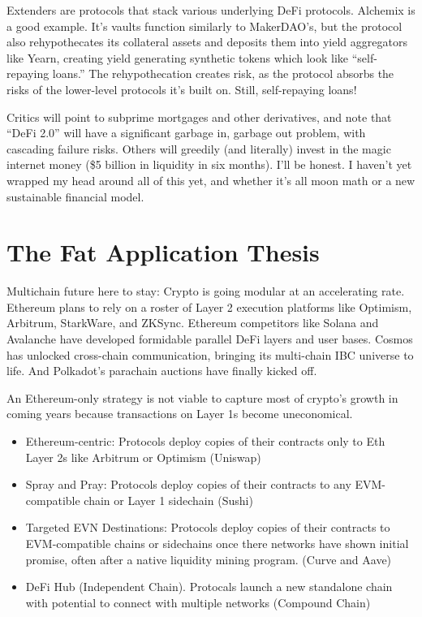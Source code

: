 \documentclass{../notes}
\begin{document}
Extenders are protocols that stack various underlying DeFi protocols. Alchemix is a good example. It’s vaults function similarly to MakerDAO’s, but the protocol also rehypothecates its collateral assets and deposits them into yield aggregators like Yearn, creating yield generating synthetic tokens which look like “self-repaying loans.” The rehypothecation creates risk, as the protocol absorbs the risks of the lower-level protocols it’s built on. Still, self-repaying loans!

Critics will point to subprime mortgages and other derivatives, and note that “DeFi 2.0” will have a significant garbage in, garbage out problem, with cascading failure risks. Others will greedily (and literally) invest in the magic internet money (\$5 billion in liquidity in six months). I’ll be honest. I haven’t yet wrapped my head around all of this yet, and whether it’s all moon math or a new sustainable financial model.

\section{The Fat Application Thesis}
Multichain future here to stay: Crypto is going modular at an accelerating rate. Ethereum plans to rely on a roster of Layer 2 execution platforms like Optimism, Arbitrum, StarkWare, and ZKSync. Ethereum competitors like Solana and Avalanche have developed formidable parallel DeFi layers and user bases. Cosmos has unlocked cross-chain communication, bringing its multi-chain IBC universe to life. And Polkadot’s parachain auctions have finally kicked off.

An Ethereum-only strategy is not viable to capture most of crypto's growth in coming years because transactions on Layer 1s become uneconomical. 
\begin{itemize}
    \item Ethereum-centric: Protocols deploy copies of their contracts only to Eth Layer 2s like Arbitrum or Optimism (Uniswap)
    \item Spray and Pray: Protocols deploy copies of their contracts to any EVM-compatible chain or Layer 1 sidechain (Sushi)
    \item Targeted EVN Destinations: Protocols deploy copies of their contracts to EVM-compatible chains or sidechains once there networks have shown initial promise, often after a native liquidity mining program. (Curve and Aave)
    \item DeFi Hub (Independent Chain). Protocals launch a new standalone chain with potential to connect with multiple networks (Compound Chain)
\end{itemize}
\end{document}
